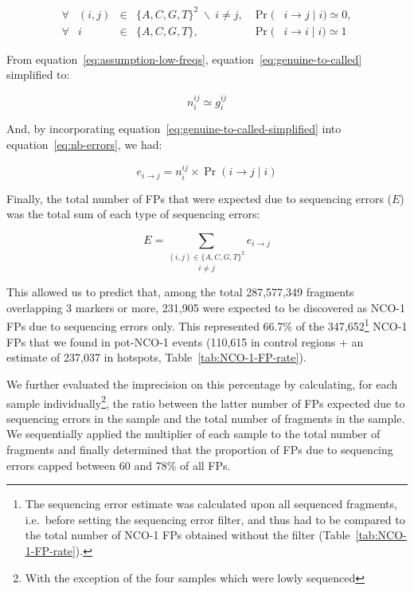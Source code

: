 \begin{subequations} 
	\begin{alignat}{5}
		\forall &(i,j) &{}\in{}& \{A, C, G, T\}^2 \; \backslash \: i \neq j, &{}\Pr({}& i\rightarrow j \mid i ) \simeq 0,\label{eq:assumption-low-freqs}\\
		\forall &i	   &{}\in{}& \{A, C, G, T\},							 &{}\Pr({}& i\rightarrow i \mid i ) \simeq 1
	\end{alignat}
\end{subequations}


From equation~\ref{eq:assumption-low-freqs}, equation~\ref{eq:genuine-to-called} simplified to:

\begin{equation} \label{eq:genuine-to-called-simplified}
	n_{i}^{ij} \simeq g_{i}^{ij}
\end{equation}

And, by incorporating equation~\ref{eq:genuine-to-called-simplified} into equation~\ref{eq:nb-errors}, we had:

\begin{equation*} \label{eq:nb-errors-with-only-known-parameters}
	e_{i\rightarrow j} = n_{i}^{ij} \times \Pr( i\rightarrow j \mid i )
\end{equation*}


Finally, the total number of FPs that were expected due to sequencing errors ($E$) was the total sum of each type of sequencing errors: 

\begin{equation*} \label{eq:sum-all-NCOs-expected}
	E = \underset{i \neq j} {\sum_{(i, j) \in \{A, C, G, T\}^2}} e_{i\rightarrow j}
\end{equation*}




This allowed us to predict that, among the total 287,577,349 fragments overlapping 3 markers or more, 231,905 were expected to be discovered as NCO-1 FPs due to sequencing errors only.
This represented 66.7\% of the 347,652\footnote{The sequencing error estimate was calculated upon all sequenced fragments, i.e.\ before setting the sequencing error filter, and thus had to be compared to the total number of NCO-1 FPs obtained without the filter (Table~\ref{tab:NCO-1-FP-rate}).} NCO-1 FPs that we found in pot-NCO-1 events (110,615 in control regions + an estimate of 237,037 in hotspots, Table~\ref{tab:NCO-1-FP-rate}).

We further evaluated the imprecision on this percentage by calculating, for each sample individually\footnote{With the exception of the four samples which were lowly sequenced}, the ratio between the latter number of FPs expected due to sequencing errors in the sample and the total number of fragments in the sample. 
We sequentially applied the multiplier of each sample to the total number of fragments and finally determined that the proportion of FPs due to sequencing errors capped between 60 and 78\% of all FPs.\\


